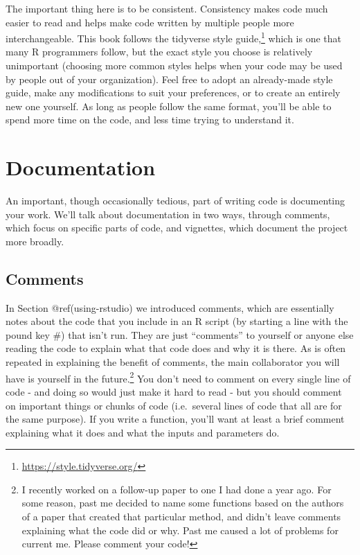 \documentclass[
  a4paper,
]{krantz}
\renewcommand{\href}[2]{#2\footnote{\url{#1}}}
\begin{document}
The important thing here is to be consistent. Consistency
makes code much easier to read and helps make code written
by multiple people more interchangeable. This book follows
the \href{https://style.tidyverse.org/}{tidyverse style
guide,} which is one that many R programmers follow, but the
exact style you choose is relatively unimportant (choosing
more common styles helps when your code may be used by
people out of your organization). Feel free to adopt an
already-made style guide, make any modifications to suit
your preferences, or to create an entirely new one yourself.
As long as people follow the same format, you'll be able to
spend more time on the code, and less time trying to
understand it.

\hypertarget{documentation}{%
\section{Documentation}\label{documentation}}

An important, though occasionally tedious, part of writing
code is documenting your work. We'll talk about
documentation in two ways, through comments, which focus on
specific parts of code, and vignettes, which document the
project more broadly.

\hypertarget{comments}{%
\subsection{Comments}\label{comments}}

In Section @ref(using-rstudio) we introduced comments, which
are essentially notes about the code that you include in an
R script (by starting a line with the pound key \#) that
isn't run. They are just ``comments'' to yourself or anyone
else reading the code to explain what that code does and why
it is there. As is often repeated in explaining the benefit
of comments, the main collaborator you will have is yourself
in the future.\footnote{I recently worked on a follow-up
  paper to one I had done a year ago. For some reason, past
  me decided to name some functions based on the authors of
  a paper that created that particular method, and didn't
  leave comments explaining what the code did or why. Past
  me caused a lot of problems for current me. Please comment
  your code!} You don't need to comment on every single line
of code - and doing so would just make it hard to read - but
you should comment on important things or chunks of code
(i.e.~several lines of code that all are for the same
purpose). If you write a function, you'll want at least a
brief comment explaining what it does and what the inputs
and parameters do.
\end{document}
